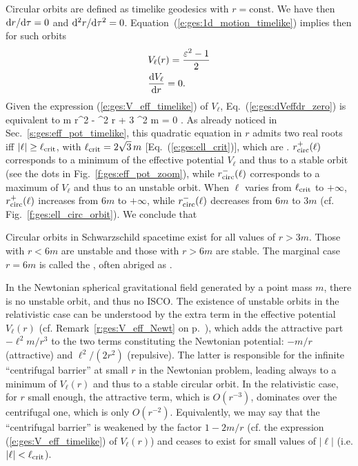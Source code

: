 Circular orbits are defined as timelike geodesics with $r = \mathrm{const}$.
We have then $\mathrm{d} r/\mathrm{d}\tau = 0$ and $\mathrm{d}^2 r/\mathrm{d}\tau^2 = 0$.
Equation~(\ref{e:ges:1d_motion_timelike}) implies then for such orbits
\begin{subequations}
\begin{align}
& V_{\ell}(r) = \frac{\varepsilon^2 - 1}{2} \label{e:ges:Veff_circ} \\
& \frac{\mathrm{d} V_{\ell}}{\mathrm{d} r} = 0 . \label{e:ges:dVeffdr_zero}
\end{align}
\end{subequations}
Given the expression (\ref{e:ges:V_eff_timelike}) of $V_{\ell}$,
Eq.~(\ref{e:ges:dVeffdr_zero}) is equivalent to
\be \label{e:ges:eq_r_ell_circ}
    m r^2 - \ell^2 r + 3 \ell^2 m = 0 .
\ee
As already noticed in Sec.~\ref{s:ges:eff_pot_timelike}, this
quadratic equation in $r$ admits two real roots iff $|\ell| \geq \ell_{\rm crit}$,
with $\ell_{\rm crit} = 2\sqrt{3}\, m$ [Eq.~(\ref{e:ges:ell_crit})],
which are
\be \label{e:ges:r_circ_ell}
    .
\ee
$r_{\rm circ}^+(\ell)$ corresponds to a minimum of the effective potential
$V_{\ell}$ and thus
to a stable orbit (see the dots in Fig.~\ref{f:ges:eff_pot_zoom}),
while $r_{\rm circ}^-(\ell)$ corresponds to a
maximum of $V_{\ell}$ and thus to an unstable orbit.
When $\ell$ varies from $\ell_{\rm crit}$ to $+\infty$,
$r_{\rm circ}^+(\ell)$ increases from $6 m$ to $+\infty$, while
$r_{\rm circ}^-(\ell)$ decreases from $6 m$ to $3 m$ (cf. Fig.~\ref{f:ges:ell_circ_orbit}). We conclude that
\begin{greybox}
Circular orbits in Schwarzschild spacetime exist for all values of $r>3m$.
Those with $r<6m$ are unstable and those with $r>6m$ are stable. The marginal
case $r=6m$ is called the , often abriged as .
\end{greybox}

\begin{remark}
In the Newtonian spherical gravitational field generated by a point mass $m$,
there is no unstable orbit, and thus no ISCO. The existence of unstable orbits
in the relativistic case can be understood by the extra term in
the effective potential $V_{\ell}(r)$ (cf. Remark~\ref{r:ges:V_eff_Newt} on p.~\pageref{r:ges:V_eff_Newt}), which
adds the attractive part $-\ell^2 m/r^3$ to the two
terms constituting the Newtonian potential: $-m/r$ (attractive) and
$\ell^2/(2 r^2)$ (repulsive). The latter is responsible for the infinite ``centrifugal
barrier'' at small $r$ in the Newtonian problem, leading
always to a minimum of $V_\ell(r)$ and thus to a stable circular orbit.
In the relativistic case, for $r$ small enough, the attractive term, which is $O(r^{-3})$, dominates over
the centrifugal one, which is only $O(r^{-2})$.
Equivalently, we may say that the ``centrifugal barrier'' is weakened by the
factor $1-2m/r$ (cf. the expression (\ref{e:ges:V_eff_timelike}) of $V_\ell(r)$)
and ceases to exist for small values of $|\ell|$ (i.e.
$|\ell|<\ell_{\rm crit}$).
\end{remark}

